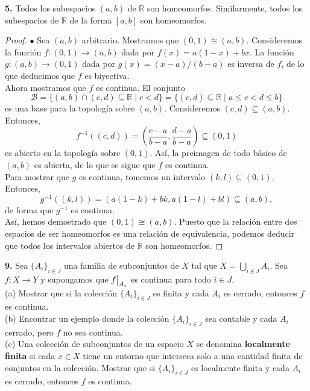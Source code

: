 \documentclass{article}
\newcommand\restr[2]{{%
		\left.\kern-\nulldelimiterspace %
		#1 %
		\vphantom{\big|} %
		\right|_{#2} %
}}
\begin{document}
\newpage

\begin{mybox}
	\textbf{5. } Todos los subespacios $(a, b)$  de $\mathbb{R}$ son homeomorfos. Similarmente, todos los subespacios de $\mathbb{R}$ de la forma $[a, b]$ son homeomorfos.
\end{mybox}	
\begin{proof}
	$\bullet$ Sea $(a, b)$ arbitrario. Mostramos que $(0,1) \cong (a, b)$. Consideremos la función $f: (0, 1) \rightarrow (a, b)$ dada por $f(x) = a(1-x) + bx$. La función $g: (a, b) \rightarrow (0, 1)$ dada por $g(x) = (x- a)/ (b - a)$ es inversa de $f$, de lo que deducimos que $f$ es biyectiva. \\
	 Ahora mostramos que $f$ es continua. El conjunto 
	$$ \mathcal{B} = \{ (a, b) \cap (c, d) \subseteq \mathbb{R} \mid c < d \} = \{ (c, d) \subseteq \mathbb{R} \mid a \leq c < d \leq b \}$$
	es una base para la topología sobre $(a, b)$.  Consideremos $(c, d) \subseteq (a, b)$. Entonces, 
	$$ f^{-1}((c, d)) = \left( \frac{c - a}{b - a}, \frac{d -a}{b - a} \right) \subseteq (0, 1) $$
	es abierto en la topología sobre $(0, 1)$. Así, la preimagen de todo básico de $(a, b)$ es abierta, de lo que se sigue que $f$ es continua. \\
	Para mostrar que $g$ es continua, tomemos un intervalo $(k, l) \subseteq (0,1)$. Entonces,
	$$ g^{-1}((k, l )) = ( a(1- k) + bk, a(1- l) + bl ) \subseteq (a, b), $$
	de forma que $g^{-1}$ es continua. \\
	Así, hemos demostrado que $(0, 1) \cong (a, b)$. Puesto que la relación entre dos espacios de ser homeomorfos es una relación de equivalencia, podemos deducir que todos los intervalos abiertos de $\mathbb{R}$ son homeomorfos. 
\end{proof}

\begin{mybox}
	\textbf{9. } Sea $\{ A_{i} \}_{i \in J}$ una familia de subconjuntos de $X$ tal que $X = \bigcup_{i \in J} A_{i}$. Sea $f: X \rightarrow Y$ y supongamos que $\restr{f}{A_{i}}$ es continua para todo $i \in J$. \\
	
	(a) Mostrar que si la colección $\{ A_{i} \}_{i \in J}$ es finita y cada $A_{i}$ es cerrado, entonces $f$ es continua. \\
	
	(b) Encontrar un ejemplo donde la colección $\{ A_{i} \}_{i \in J}$ sea contable y cada $A_{i}$ cerrado, pero $f$ no sea continua.  \\
	
	(c) Una colección de subconjuntos de un espacio $X$ se denomina \textbf{localmente finita} si cada $x \in X$ tiene un entorno que interseca solo a una cantidad finita de conjuntos en la colección. Mostrar que si $\{ A_{i} \}_{i \in J}$ es localmente finita y cada $A_{i}$ es cerrado, entonces $f$ es continua.
	
\end{mybox}	
\end{document}
